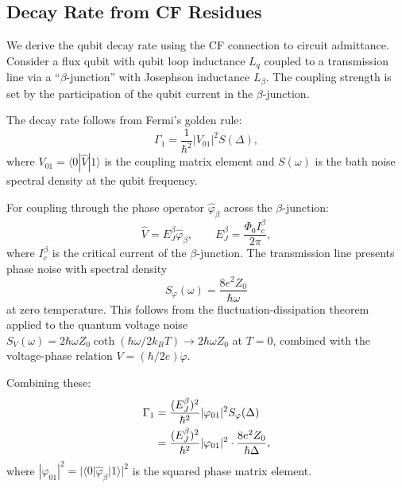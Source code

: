 \documentclass[reprint, floatfix, superscriptaddress, amsmath, amssymb, longbibliography]{revtex4-2}
\begin{document}
\subsection{Decay Rate from CF Residues}
\label{sec:decay_derivation}

We derive the qubit decay rate using the CF connection to circuit admittance. Consider a flux qubit with qubit loop inductance $L_q$ coupled to a transmission line via a ``$\beta$-junction'' with Josephson inductance $L_\beta$. The coupling strength is set by the participation of the qubit current in the $\beta$-junction.

The decay rate follows from Fermi's golden rule:
\begin{equation}
\Gamma_1 = \frac{1}{\hbar^2}|V_{01}|^2 S(\Delta),
\label{eq:fermi_rule}
\end{equation}
where $V_{01} = \langle 0|\hat{V}|1\rangle$ is the coupling matrix element and $S(\omega)$ is the bath noise spectral density at the qubit frequency.

For coupling through the phase operator $\hat{\varphi}_\beta$ across the $\beta$-junction:
\begin{equation}
\hat{V} = E_J^\beta \hat{\varphi}_\beta, \qquad E_J^\beta = \frac{\Phi_0 I_c^\beta}{2\pi},
\label{eq:coupling_operator}
\end{equation}
where $I_c^\beta$ is the critical current of the $\beta$-junction. The transmission line presents phase noise with spectral density
\begin{equation}
S_\varphi(\omega) = \frac{8e^2 Z_0}{\hbar\omega}
\label{eq:phase_noise}
\end{equation}
at zero temperature. This follows from the fluctuation-dissipation theorem applied to the quantum voltage noise $S_V(\omega) = 2\hbar\omega Z_0 \coth(\hbar\omega/2k_BT) \to 2\hbar\omega Z_0$ at $T=0$, combined with the voltage-phase relation $V = (\hbar/2e)\dot{\varphi}$.

Combining these:
\begin{align}
\Gamma_1 &= \frac{(E_J^\beta)^2}{\hbar^2}|\varphi_{01}|^2 S_\varphi(\Delta) \notag \\
&= \frac{(E_J^\beta)^2}{\hbar^2}|\varphi_{01}|^2 \cdot \frac{8e^2 Z_0}{\hbar\Delta},
\label{eq:gamma_derivation}
\end{align}
where $|\varphi_{01}|^2 = |\langle 0|\hat{\varphi}_\beta|1\rangle|^2$ is the squared phase matrix element.
\end{document}
